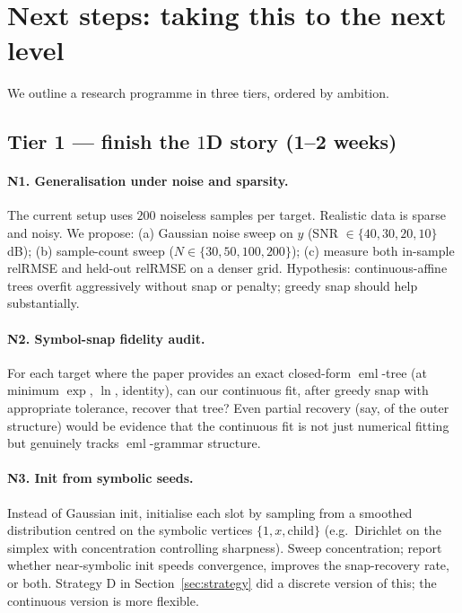 \documentclass[11pt]{article}
\newcommand{\eml}{\operatorname{eml}}
\begin{document}
\section{Next steps: taking this to the next level}
\label{sec:next}

We outline a research programme in three tiers, ordered by ambition.

\subsection{Tier 1 — finish the $1$D story (1--2 weeks)}

\paragraph{N1. Generalisation under noise and sparsity.}
The current setup uses $200$ noiseless samples per target. Realistic data is
sparse and noisy. We propose: (a) Gaussian noise sweep on $y$ (SNR $\in
\{40, 30, 20, 10\}$ dB); (b) sample-count sweep ($N \in \{30, 50, 100, 200\}$);
(c) measure both in-sample relRMSE and held-out relRMSE on a denser grid.
Hypothesis: continuous-affine trees overfit aggressively without snap or
penalty; greedy snap should help substantially.

\paragraph{N2. Symbol-snap fidelity audit.}
For each target where the paper provides an exact closed-form $\eml$-tree
(at minimum $\exp$, $\ln$, identity), can our continuous fit, after greedy
snap with appropriate tolerance, recover that tree? Even partial recovery
(say, of the outer structure) would be evidence that the continuous fit is
not just numerical fitting but genuinely tracks $\eml$-grammar structure.

\paragraph{N3. Init from symbolic seeds.}
Instead of Gaussian init, initialise each slot by sampling from a smoothed
distribution centred on the symbolic vertices $\{1, x, \text{child}\}$
(e.g.\ Dirichlet on the simplex with concentration controlling sharpness).
Sweep concentration; report whether near-symbolic init speeds convergence,
improves the snap-recovery rate, or both. Strategy D in
Section~\ref{sec:strategy} did a discrete version of this; the continuous
version is more flexible.
\end{document}
